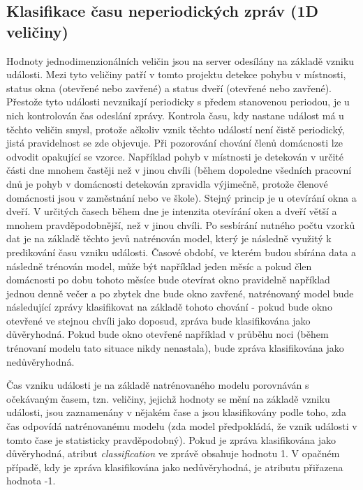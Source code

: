 \subsection{Klasifikace času neperiodických zpráv (1D veličiny)} \label{subsec:1D_quantities}
Hodnoty jednodimenzionálních veličin jsou na server odesílány na základě vzniku události. Mezi tyto veličiny patří v tomto projektu detekce pohybu v místnosti, status okna (otevřené nebo zavřené) a status dveří (otevřené nebo zavřené). Přestože tyto události nevznikají periodicky s předem stanovenou periodou, je u nich kontrolován čas odeslání zprávy. Kontrola času, kdy nastane událost má u těchto veličin smysl, protože ačkoliv vznik těchto událostí není čistě periodický, jistá pravidelnost se zde objevuje. Při pozorování chování členů domácnosti lze odvodit opakující se vzorce. Například pohyb v místnosti je detekován v určité části dne mnohem častěji než v jinou chvíli (během dopoledne všedních pracovní dnů je pohyb v domácnosti detekován zpravidla výjimečně, protože členové domácnosti jsou v zaměstnání nebo ve škole). Stejný princip je u otevírání okna a dveří. V určitých časech během dne je intenzita otevírání oken a dveří větší a mnohem pravděpodobnější, než v jinou chvíli. Po sesbírání nutného počtu vzorků dat je na základě těchto jevů natrénován model, který je následně využitý k predikování času vzniku události. Časové období, ve kterém budou sbírána data a následně trénován model, může být například jeden měsíc a pokud člen domácnosti po dobu tohoto měsíce bude otevírat okno pravidelně například jednou denně večer a po zbytek dne bude okno zavřené, natrénovaný model bude následující zprávy klasifikovat na základě tohoto chování - pokud bude okno otevřené ve stejnou chvíli jako doposud, zpráva bude klasifikována jako důvěryhodná. Pokud bude okno otevřené například v průběhu noci (během trénovaní modelu tato situace nikdy nenastala), bude zpráva klasifikována jako nedůvěryhodná.\par
Čas vzniku události je na základě natrénovaného modelu porovnáván s očekávaným časem, tzn. veličiny, jejichž hodnoty se mění na základě vzniku události, jsou zaznamenány v nějakém čase a jsou klasifikovány podle toho, zda čas odpovídá natrénovanému modelu (zda model předpokládá, že vznik události v tomto čase je statisticky pravděpodobný). Pokud je zpráva klasifikována jako důvěryhodná, atribut \textit{classification} ve zprávě obsahuje hodnotu 1. V opačném případě, kdy je zpráva klasifikována jako nedůvěryhodná, je atributu přiřazena hodnota -1. 

